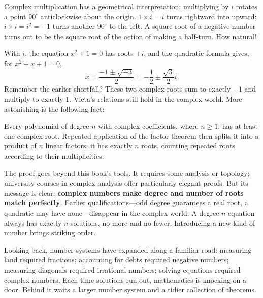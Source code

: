 \begin{center}
\end{center}

Complex multiplication has a geometrical interpretation: multiplying by $i$ rotates a point $90^\circ$ anticlockwise about the origin. $1\times i = i$ turns rightward into upward; $i\times i = i^2 = -1$ turns another $90^\circ$ to the left. A square root of a negative number turns out to be the square root of the action of making a half-turn. How natural!

With $i$, the equation $x^2+1=0$ has roots $\pm i$, and the quadratic formula gives, for $x^2+x+1=0$,
\[
x=\frac{-1\pm\sqrt{-3}}{2}=-\frac{1}{2}\pm\frac{\sqrt{3}}{2}i.
\]
Remember the earlier shortfall? These two complex roots sum to exactly $-1$ and multiply to exactly $1$. Vieta's relations still hold in the complex world. More astonishing is the following fact:

\begin{dingli}
Every polynomial of degree $n$ with complex coefficients, where $n\ge 1$, has at least one complex root. Repeated application of the factor theorem then splits it into a product of $n$ linear factors: it has exactly $n$ roots, counting repeated roots according to their multiplicities.
\end{dingli}

The proof goes beyond this book's tools. It requires some analysis or topology; university courses in complex analysis offer particularly elegant proofs. But its message is clear: \textbf{complex numbers make degree and number of roots match perfectly}. Earlier qualifications---odd degree guarantees a real root, a quadratic may have none---disappear in the complex world. A degree-$n$ equation always has exactly $n$ solutions, no more and no fewer. Introducing a new kind of number brings striking order.

Looking back, number systems have expanded along a familiar road: measuring land required fractions; accounting for debts required negative numbers; measuring diagonals required irrational numbers; solving equations required complex numbers. Each time solutions run out, mathematics is knocking on a door. Behind it waits a larger number system and a tidier collection of theorems.

